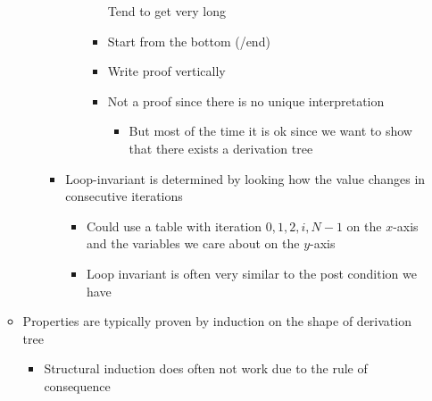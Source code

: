 \begin{itemize}
\begin{itemize}
\begin{itemize}
\begin{itemize}
\begin{itemize}
\begin{itemize}
                                                \icon Tend to get very long
                                            \item Start from the bottom (/end)
                                        \end{itemize}
                                        \begin{itemize}
                                            \item Write proof vertically
                                            \item Not a proof since there is no unique interpretation
                                                \begin{itemize}
                                                    \item But most of the time it is ok since we want to show that there exists a derivation tree
                                                \end{itemize}
                                        \end{itemize}
                                \end{itemize}
                            \item Loop-invariant is determined by looking how the value changes in consecutive iterations
                                \begin{itemize}
                                    \item Could use a table with iteration $0, 1, 2, i, N-1$ on the $x$-axis and the variables we care about on the $y$-axis
                                    \item Loop invariant is often very similar to the post condition we have
                                \end{itemize}
                        \end{itemize}
                \end{itemize}
        \end{itemize}
        \begin{itemize}
            \item Properties are typically proven by induction on the shape of derivation tree
                \begin{itemize}
                    \item Structural induction does often not work due to the rule of consequence
                \end{itemize}

\end{itemize}
\end{itemize}
